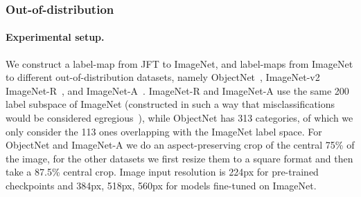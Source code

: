 \documentclass{article}
\begin{document}
\begin{table}
\centering
\caption{Zero-shot transfer results on ImageNet (variants).}
\label{tab:lit}
\end{table}

\subsubsection{Out-of-distribution}
\label{subsec:robustness_ood}

\paragraph{Experimental setup.} We construct a label-map from JFT to ImageNet, and label-maps from ImageNet to different out-of-distribution datasets, namely ObjectNet~\citep{barbu2019objectnet}, ImageNet-v2~\citep{recht2019imagenet_v2} ImageNet-R~\citep{hendrycks2020imagenet_r}, and ImageNet-A~\citep{hendrycks2021imagenet_a}. ImageNet-R and ImageNet-A use the same 200 label subspace of ImageNet (constructed in such a way that misclassifications would be considered egregious~\citep{hendrycks2021imagenet_a}), while ObjectNet has 313 categories, of which we only consider the 113 ones overlapping with the ImageNet label space. For ObjectNet and ImageNet-A we do an aspect-preserving crop of the central 75\% of the image, for the other datasets we first resize them to a square format and then take a 87.5\% central crop. Image input resolution is 224px for pre-trained checkpoints and 384px, 518px, 560px for models fine-tuned on ImageNet.
\end{document}
